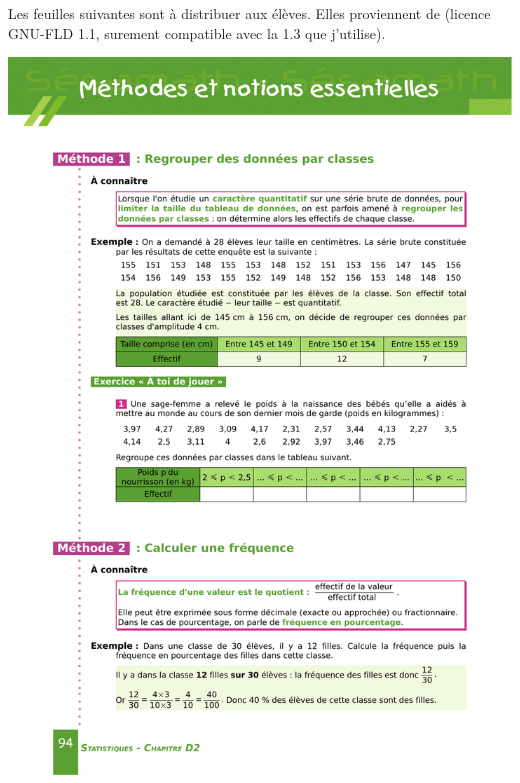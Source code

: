 


Les feuilles suivantes sont à distribuer aux élèves. Elles proviennent de \cite{NRHooXFvgpp5} (licence GNU-FLD 1.1, surement compatible avec la 1.3 que j'utilise).


\begin{center}
\includegraphics{sesamath5p94.pdf}
\end{center}
